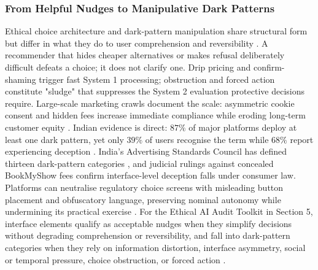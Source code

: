 \documentclass[11pt]{article}
\begin{document}
\subsubsection{From Helpful Nudges to Manipulative Dark Patterns}
\label{sec:helpful_nudges_to_dark_patterns} Ethical choice architecture and dark-pattern manipulation share structural form but differ in what they do to user comprehension and reversibility \parencites[32--33]{6087241}. A recommender that hides cheaper alternatives or makes refusal deliberately difficult defeats a choice; it does not clarify one. Drip pricing and confirm-shaming trigger fast System 1 processing; obstruction and forced action constitute "sludge" \parencites[2]{6295677}[4]{6295677} that suppresses the System 2 evaluation protective decisions require. Large-scale marketing crawls document the scale: asymmetric cookie consent and hidden fees increase immediate compliance while eroding long-term customer equity \parencites[33]{6087241}. Indian evidence is direct: $87\%$ of major platforms deploy at least one dark pattern, yet only $39\%$ of users recognise the term while $68\%$ report experiencing deception \parencites[2]{6295677}. India's Advertising Standards Council has defined thirteen dark-pattern categories \parencites[3]{6295677}, and judicial rulings against concealed BookMyShow fees confirm interface-level deception falls under consumer law. Platforms can neutralise regulatory choice screens with misleading button placement and obfuscatory language, preserving nominal autonomy while undermining its practical exercise \parencites[159]{1070605}. For the Ethical AI Audit Toolkit in Section 5, interface elements qualify as acceptable nudges when they simplify decisions without degrading comprehension or reversibility, and fall into dark-pattern categories when they rely on information distortion, interface asymmetry, social or temporal pressure, choice obstruction, or forced action \parencites[32--33]{6087241}[2]{6295677}[4]{6295677}.
\end{document}
